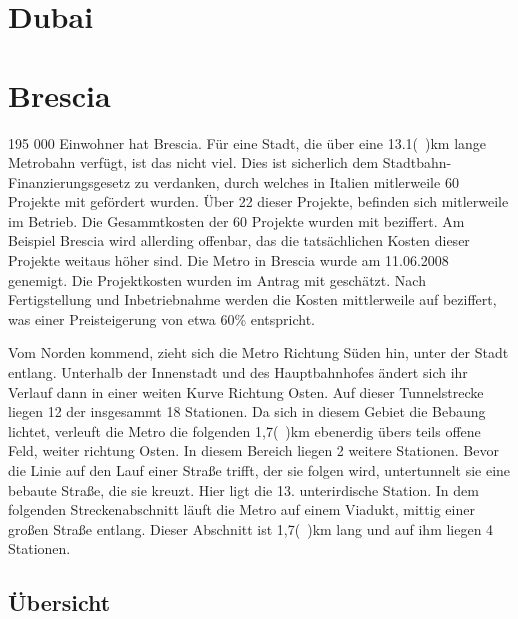 \section{Dubai}


\section{Brescia} 

195 000 Einwohner hat Brescia. Für eine Stadt, die über eine 13.1(\ )km lange Metrobahn verfügt, ist das nicht viel. Dies ist sicherlich dem Stadtbahn-Finanzierungsgesetz zu verdanken, durch welches in Italien mitlerweile 60 Projekte mit  gefördert wurden. Über 22 dieser Projekte, befinden sich mitlerweile im Betrieb. Die Gesammtkosten der 60 Projekte wurden mit  beziffert. Am Beispiel Brescia wird allerding offenbar, das die tatsächlichen Kosten dieser Projekte weitaus höher sind. Die Metro in Brescia wurde am 11.06.2008 genemigt. Die Projektkosten wurden im Antrag mit  geschätzt.\cite{brescSv} Nach Fertigstellung und Inbetriebnahme werden die Kosten mittlerweile auf  beziffert, was einer Preisteigerung von etwa 60\% entspricht\cite{brescRai}.  

Vom Norden kommend, zieht sich die Metro Richtung Süden hin, unter der Stadt entlang. Unterhalb der Innenstadt und des Hauptbahnhofes ändert sich ihr Verlauf dann in einer weiten Kurve Richtung Osten. Auf dieser Tunnelstrecke liegen 12 der insgesammt 18 Stationen. Da sich in diesem Gebiet die Bebaung lichtet, verleuft die Metro die folgenden 1,7(\ )km ebenerdig übers teils offene Feld, weiter richtung Osten. In diesem Bereich liegen 2 weitere Stationen. Bevor die Linie auf den Lauf einer Straße trifft, der sie folgen wird, untertunnelt sie eine bebaute Straße, die sie kreuzt. Hier ligt die 13. unterirdische Station. In dem folgenden Streckenabschnitt läuft die Metro auf einem Viadukt, mittig einer großen Straße entlang. Dieser Abschnitt ist 1,7(\ )km lang und auf ihm liegen 4 Stationen.\cite{brescSts}


\begin{landscape}
\section{Übersicht}

\end{landscape}

